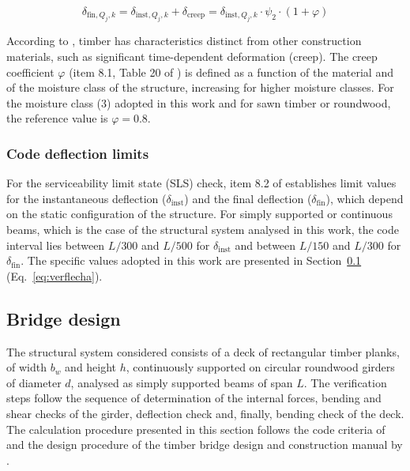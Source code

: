 \begin{equation}
\delta_{\mathrm{fin},Q_j,k}
=
\delta_{\mathrm{inst},Q_j,k}
+ \delta_{\mathrm{creep}}
=
\delta_{\mathrm{inst},Q_j,k} \cdot \psi_{2} \cdot (1 + \varphi)
\label{eq:flecha_fin_Q}
\end{equation}

According to \textcite{NBR7190-1:2022}, timber has characteristics distinct from other construction materials, such as significant time-dependent deformation (creep).
The creep coefficient $\varphi$ (item 8.1, Table 20 of \textcite{NBR7190-1:2022}) is defined as a function of the material and of the moisture class of the structure, increasing for higher moisture classes. For the moisture class (3) adopted in this work and for sawn timber or roundwood, the reference value is $\varphi = 0.8$.

\subsubsection{Code deflection limits}

For the serviceability limit state (SLS) check, item 8.2 of \textcite{NBR7190-1:2022} establishes limit values for the instantaneous deflection ($\delta_{\mathrm{inst}}$) and the final deflection ($\delta_{\mathrm{fin}}$), which depend on the static configuration of the structure.
For simply supported or continuous beams, which is the case of the structural system analysed in this work, the code interval lies between $L/300$ and $L/500$ for $\delta_{\mathrm{inst}}$ and between $L/150$ and $L/300$ for $\delta_{\mathrm{fin}}$. The specific values adopted in this work are presented in Section~\ref{sec:projeto_ponte} (Eq.~\eqref{eq:verflecha}).

\subsection{Bridge design}\label{sec:projeto_ponte}

The structural system considered consists of a deck of rectangular timber planks, of width $b_w$ and height $h$, continuously supported on circular roundwood girders of diameter $d$, analysed as simply supported beams of span $L$.
The verification steps follow the sequence of determination of the internal forces, bending and shear checks of the girder, deflection check and, finally, bending check of the deck.
The calculation procedure presented in this section follows the code criteria of \textcite{NBR7190-1:2022} and the design procedure of the timber bridge design and construction manual by \textcite{CALIL2006}.

